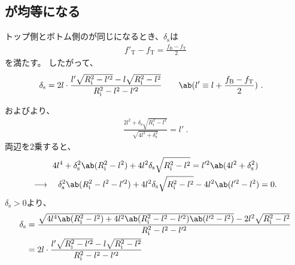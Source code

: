 \subsection{\AlocationLength が均等になる\SpacerThickness}
トップ側とボトム側の\AlocationLength が同じになるとき、$\delta_\mathrm s$は
\begin{align}
  \label{eq:condtionequalalocation}
  f'_\mathrm T - f_\mathrm T = \frac{f_\mathrm B - f_\mathrm T}2
\end{align}
を満たす。
したがって、
\begin{align*}
  \delta_\mathrm s
  &= 2l\cdot\frac{l'\sqrt{R_\mathrm i^2-l'^2}-l\sqrt{R_\mathrm i^2-l^2}}{R_\mathrm i^2-l^2-l'^2}
     \qquad\ab(l' \equiv l + \frac{f_\mathrm B-f_\mathrm T}2)\ .
\end{align*}
\begin{hosoku}
およびより、
\begin{align*}
  \frac{2l^2+\delta_\mathrm s\sqrt{R_\mathrm i^2-l^2}}{\sqrt{4l^2+\delta_\mathrm s^2}} = l'\ .
\end{align*}
両辺を2乗すると、
\begin{gather*}
  4l^4+\delta_\mathrm s^2\ab(R_\mathrm i^2-l^2)+4l^2\delta_\mathrm s\sqrt{R_\mathrm i^2-l^2}
  = l'^2\ab(4l^2+\delta_\mathrm s^2)\\
  \longrightarrow\quad
  \delta_\mathrm s^2\ab(R_\mathrm i^2-l^2-l'^2)
  +4l^2\delta_\mathrm s\sqrt{R_\mathrm i^2-l^2} -4l^2\ab(l'^2 - l^2)
  = 0.
\end{gather*}
$\delta_\mathrm s > 0$より、
\begin{align*}
  \delta_\mathrm s
  &= \frac{\sqrt{4l^4\ab(R_\mathrm i^2-l^2)
                 +4l^2\ab(R_\mathrm i^2-l^2-l'^2)\ab(l'^2 - l^2)}
           -2l^2\sqrt{R_\mathrm i^2-l^2}}{R_\mathrm i^2-l^2-l'^2}\\
  &= 2l\cdot\frac{l'\sqrt{R_\mathrm i^2-l'^2}-l\sqrt{R_\mathrm i^2-l^2}}{R_\mathrm i^2-l^2-l'^2}
\end{align*}
\end{hosoku}



